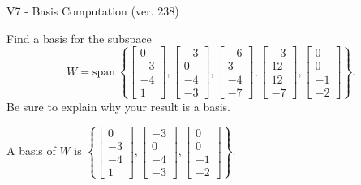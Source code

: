 \begin{exercise}
  \begin{exerciseTitle}V7 - Basis Computation (ver. 238)\end{exerciseTitle}
  \begin{exerciseStatement}
    Find a basis for the subspace 
\[W=\mathrm{span}\ \left\{\left[\begin{array}{r}
0 \\
-3 \\
-4 \\
1
\end{array}\right] , \left[\begin{array}{r}
-3 \\
0 \\
-4 \\
-3
\end{array}\right] , \left[\begin{array}{r}
-6 \\
3 \\
-4 \\
-7
\end{array}\right] , \left[\begin{array}{r}
-3 \\
12 \\
12 \\
-7
\end{array}\right] , \left[\begin{array}{r}
0 \\
0 \\
-1 \\
-2
\end{array}\right]\right\}.\]
 Be sure to explain why your result is a basis.


  \end{exerciseStatement}
  \begin{exerciseAnswer}
   A basis of \(W\) is  \(\left\{\left[\begin{array}{r}
0 \\
-3 \\
-4 \\
1
\end{array}\right] , \left[\begin{array}{r}
-3 \\
0 \\
-4 \\
-3
\end{array}\right] , \left[\begin{array}{r}
0 \\
0 \\
-1 \\
-2
\end{array}\right]\right\}\).
  


  \end{exerciseAnswer}
\end{exercise}